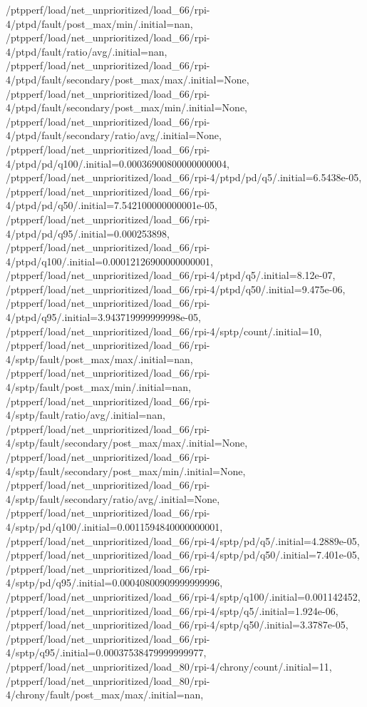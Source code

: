 {    /ptpperf/load/net_unprioritized/load_66/rpi-4/ptpd/fault/post_max/min/.initial=nan,
    /ptpperf/load/net_unprioritized/load_66/rpi-4/ptpd/fault/ratio/avg/.initial=nan,
    /ptpperf/load/net_unprioritized/load_66/rpi-4/ptpd/fault/secondary/post_max/max/.initial=None,
    /ptpperf/load/net_unprioritized/load_66/rpi-4/ptpd/fault/secondary/post_max/min/.initial=None,
    /ptpperf/load/net_unprioritized/load_66/rpi-4/ptpd/fault/secondary/ratio/avg/.initial=None,
    /ptpperf/load/net_unprioritized/load_66/rpi-4/ptpd/pd/q100/.initial=0.00036900800000000004,
    /ptpperf/load/net_unprioritized/load_66/rpi-4/ptpd/pd/q5/.initial=6.5438e-05,
    /ptpperf/load/net_unprioritized/load_66/rpi-4/ptpd/pd/q50/.initial=7.542100000000001e-05,
    /ptpperf/load/net_unprioritized/load_66/rpi-4/ptpd/pd/q95/.initial=0.000253898,
    /ptpperf/load/net_unprioritized/load_66/rpi-4/ptpd/q100/.initial=0.00012126900000000001,
    /ptpperf/load/net_unprioritized/load_66/rpi-4/ptpd/q5/.initial=8.12e-07,
    /ptpperf/load/net_unprioritized/load_66/rpi-4/ptpd/q50/.initial=9.475e-06,
    /ptpperf/load/net_unprioritized/load_66/rpi-4/ptpd/q95/.initial=3.943719999999998e-05,
    /ptpperf/load/net_unprioritized/load_66/rpi-4/sptp/count/.initial=10,
    /ptpperf/load/net_unprioritized/load_66/rpi-4/sptp/fault/post_max/max/.initial=nan,
    /ptpperf/load/net_unprioritized/load_66/rpi-4/sptp/fault/post_max/min/.initial=nan,
    /ptpperf/load/net_unprioritized/load_66/rpi-4/sptp/fault/ratio/avg/.initial=nan,
    /ptpperf/load/net_unprioritized/load_66/rpi-4/sptp/fault/secondary/post_max/max/.initial=None,
    /ptpperf/load/net_unprioritized/load_66/rpi-4/sptp/fault/secondary/post_max/min/.initial=None,
    /ptpperf/load/net_unprioritized/load_66/rpi-4/sptp/fault/secondary/ratio/avg/.initial=None,
    /ptpperf/load/net_unprioritized/load_66/rpi-4/sptp/pd/q100/.initial=0.0011594840000000001,
    /ptpperf/load/net_unprioritized/load_66/rpi-4/sptp/pd/q5/.initial=4.2889e-05,
    /ptpperf/load/net_unprioritized/load_66/rpi-4/sptp/pd/q50/.initial=7.401e-05,
    /ptpperf/load/net_unprioritized/load_66/rpi-4/sptp/pd/q95/.initial=0.00040800909999999996,
    /ptpperf/load/net_unprioritized/load_66/rpi-4/sptp/q100/.initial=0.001142452,
    /ptpperf/load/net_unprioritized/load_66/rpi-4/sptp/q5/.initial=1.924e-06,
    /ptpperf/load/net_unprioritized/load_66/rpi-4/sptp/q50/.initial=3.3787e-05,
    /ptpperf/load/net_unprioritized/load_66/rpi-4/sptp/q95/.initial=0.00037538479999999977,
    /ptpperf/load/net_unprioritized/load_80/rpi-4/chrony/count/.initial=11,
    /ptpperf/load/net_unprioritized/load_80/rpi-4/chrony/fault/post_max/max/.initial=nan,
}
